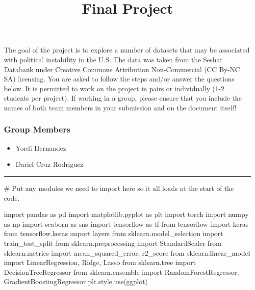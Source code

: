 \documentclass[
  letterpaper,
  DIV=11,
  numbers=noendperiod]{scrartcl}
\title{Final Project}
\author{}
\date{}
\newenvironment{Shaded}{\begin{snugshade}}{\end{snugshade}}
\newcommand{\CommentTok}[1]{\textcolor[rgb]{0.37,0.37,0.37}{#1}}
\newcommand{\ImportTok}[1]{\textcolor[rgb]{0.00,0.46,0.62}{#1}}
\newcommand{\NormalTok}[1]{\textcolor[rgb]{0.00,0.23,0.31}{#1}}
\newcommand{\StringTok}[1]{\textcolor[rgb]{0.13,0.47,0.30}{#1}}
\providecommand{\tightlist}{%
  \setlength{\itemsep}{0pt}\setlength{\parskip}{0pt}}\usepackage{longtable,booktabs,array}
\begin{document}
\maketitle


The goal of the project is to explore a number of datasets that may be
associated with political instability in the U.S. The data was taken
from the Seshat Databank under Creative Commons Attribution
Non-Commercial (CC By-NC SA) licensing. You are asked to follow the
steps and/or answer the questions below. It is permitted to work on the
project in pairs or individually (1-2 students per project). If working
in a group, please ensure that you include the names of both team
members in your submission and on the document itself!

\subsubsection{Group Members}\label{group-members}

\begin{itemize}
\tightlist
\item
  Yordi Hernandez
\item
  Dariel Cruz Rodriguez
\end{itemize}

\begin{center}\rule{0.5\linewidth}{0.5pt}\end{center}

\begin{Shaded}
\begin{Highlighting}[]
\CommentTok{\# Put any modules we need to import here so it all loads at the start of the code.}

\ImportTok{import}\NormalTok{ pandas }\ImportTok{as}\NormalTok{ pd}
\ImportTok{import}\NormalTok{ matplotlib.pyplot }\ImportTok{as}\NormalTok{ plt}
\ImportTok{import}\NormalTok{ torch}
\ImportTok{import}\NormalTok{ numpy }\ImportTok{as}\NormalTok{ np}
\ImportTok{import}\NormalTok{ seaborn }\ImportTok{as}\NormalTok{ sns}
\ImportTok{import}\NormalTok{ tensorflow }\ImportTok{as}\NormalTok{ tf}
\ImportTok{from}\NormalTok{ tensorflow }\ImportTok{import}\NormalTok{ keras}
\ImportTok{from}\NormalTok{ tensorflow.keras }\ImportTok{import}\NormalTok{ layers}
\ImportTok{from}\NormalTok{ sklearn.model\_selection }\ImportTok{import}\NormalTok{ train\_test\_split}
\ImportTok{from}\NormalTok{ sklearn.preprocessing }\ImportTok{import}\NormalTok{ StandardScaler}
\ImportTok{from}\NormalTok{ sklearn.metrics }\ImportTok{import}\NormalTok{ mean\_squared\_error, r2\_score}
\ImportTok{from}\NormalTok{ sklearn.linear\_model }\ImportTok{import}\NormalTok{ LinearRegression, Ridge, Lasso}
\ImportTok{from}\NormalTok{ sklearn.tree }\ImportTok{import}\NormalTok{ DecisionTreeRegressor}
\ImportTok{from}\NormalTok{ sklearn.ensemble }\ImportTok{import}\NormalTok{ RandomForestRegressor, GradientBoostingRegressor}
\NormalTok{plt.style.use(}\StringTok{\textquotesingle{}ggplot\textquotesingle{}}\NormalTok{)}
\end{Highlighting}
\end{Shaded}
\end{document}
